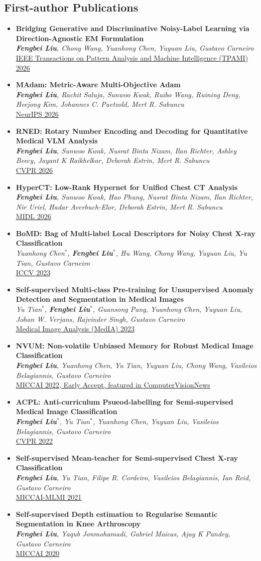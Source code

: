 \documentclass[letterpaper,11pt]{article}
\newcommand{\resumePubheading}[3]{
  \vspace{-2pt} \item\small{
    {\textbf{#1} \vspace{-2pt}}\\
    {\textit{\small#2}}\\ 
    \underline{\small#3}
  }
}
\newcommand{\resumeSubHeadingListStart}{\begin{itemize}[leftmargin=0.15in, label={}]}
\newcommand{\resumeSubHeadingListEnd}{\end{itemize}}
\begin{document}
  \vspace{3pt}
  \subsection*{First-author Publications}
  \resumeSubHeadingListStart
    \resumePubheading{Bridging Generative and Discriminative Noisy-Label Learning via Direction-Agnostic EM Formulation}{\textbf{Fengbei Liu}, Chong Wang, Yuanhong Chen, Yuyuan Liu, Gustavo Carneiro}{IEEE Transactions on Pattern Analysis and Machine Intelligence (TPAMI) 2026}
    \resumePubheading{MAdam: Metric-Aware Multi-Objective Adam}{\textbf{Fengbei Liu}, Rachit Saluja, Sunwoo Kwak, Ruibo Wang, Ruining Deng, Heejong Kim, Johannes C. Paetzold, Mert R. Sabuncu}{NeurIPS 2026}
    \resumePubheading{RNED: Rotary Number Encoding and Decoding for Quantitative Medical VLM Analysis}{\textbf{Fengbei Liu}, Sunwoo Kwak, Nusrat Binta Nizam, Ilan Richter, Ashley Beecy, Jayant K Raikhelkar, Deborah Estrin, Mert R. Sabuncu}{CVPR 2026}
    \resumePubheading{HyperCT: Low-Rank Hypernet for Unified Chest CT Analysis}{\textbf{Fengbei Liu}, Sunwoo Kwak, Hao Phung, Nusrat Binta Nizam, Ilan Richter, Nir Uriel, Hadar Averbuch-Elor, Deborah Estrin, Mert R. Sabuncu}{MIDL 2026}
    \resumePubheading{BoMD: Bag of Multi-label Local Descriptors for Noisy Chest X-ray Classification}{Yuanhong Chen$^*$, \textbf{Fengbei Liu}$^*$, Hu Wang, Chong Wang, Yuyuan Liu, Yu Tian, Gustavo Carneiro}{ICCV 2023}
    \resumePubheading{Self-supervised Multi-class Pre-training for Unsupervised Anomaly Detection and Segmentation in Medical Images}{Yu Tian$^*$, \textbf{Fengbei Liu}$^*$, Guansong Pang, Yuanhong Chen, Yuyuan Liu, Johan W. Verjans, Rajvinder Singh, Gustavo Carneiro}{Medical Image Analysis (MedIA) 2023}
    \resumePubheading{NVUM: Non-volatile Unbiased Memory for Robust Medical Image Classification}{\textbf{Fengbei Liu}, Yuanhong Chen, Yu Tian, Yuyuan Liu, Chong Wang, Vasileios Belagiannis, Gustavo Carneiro}{MICCAI 2022, Early Accept, featured in ComputerVisionNews}
    \resumePubheading{ACPL: Anti-curriculum Psueod-labelling for Semi-supervised Medical Image Classification}{\textbf{Fengbei Liu}$^*$, Yu Tian$^*$, Yuanhong Chen, Yuyuan Liu, Vasileios Belagiannis, Gustavo Carneiro}{CVPR 2022}
    \resumePubheading{Self-supervised Mean-teacher for Semi-supervised Chest X-ray Classification}{\textbf{Fengbei Liu}, Yu Tian, Filipe R. Cordeiro, Vasileios Belagiannis, Ian Reid, Gustavo Carneiro}{MICCAI-MLMI 2021}
    \resumePubheading{Self-supervised Depth estimation to Regularise Semantic Segmentation in Knee Arthroscopy}{\textbf{Fengbei Liu}, Yaqub Jonmohamadi, Gabriel Maicas, Ajay K Pandey, Gustavo Carneiro}{MICCAI 2020}
  \resumeSubHeadingListEnd
\end{document}
